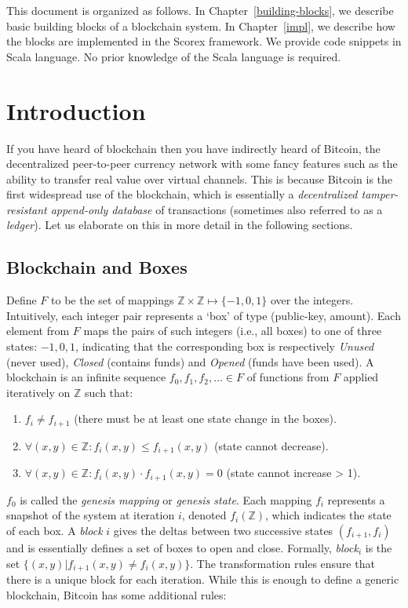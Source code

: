 \documentclass[]{report}   %
\begin{document}
This document is organized as follows. In Chapter~\ref{building-blocks}, we describe basic building blocks of a blockchain system. In Chapter~\ref{impl}, we describe how the blocks are implemented in the Scorex framework. We provide code snippets in Scala language. No prior knowledge of the Scala language is required.


\chapter{Introduction}

If you have heard of blockchain then you have indirectly heard of Bitcoin, the decentralized peer-to-peer currency network with some fancy features such as the ability to transfer real value over virtual channels. This is because Bitcoin is the first widespread use of the blockchain, which is essentially a {\em decentralized tamper-resistant append-only database} of transactions (sometimes also referred to as a {\em ledger}). Let us elaborate on this in more detail in the following sections. 

\section{Blockchain and Boxes}


Define $F$ to be the set of mappings $\mathbb{Z}\times\mathbb{Z} \mapsto \{-1, 0, 1\}$ over the integers. 
Intuitively, each integer pair represents a `box' of type (public-key, amount). Each element from $F$ maps the pairs of such integers (i.e., all boxes) to one of three states: $-1, 0, 1$, indicating that the corresponding box is respectively {\em Unused} (never used), {\em Closed} (contains funds) and {\em Opened} (funds have been used).
A blockchain is an infinite sequence $f_0, f_1, f_2, \ldots \in F$ of functions from $F$ applied iteratively on $\mathbb{Z}$ such that: %
\begin{enumerate}
	\item $f_i \neq f_{i+1}$ (there must be at least one state change in the boxes).
	\item $\forall (x, y) \in \mathbb{Z}: f_i(x, y) \leq f_{i+1}(x, y)$ (state cannot decrease).
	\item $\forall (x, y) \in \mathbb{Z}: f_i(x, y)\cdot f_{i+1}(x, y) = 0$ (state cannot increase > 1).
\end{enumerate}

$f_0$ is called the {\em genesis mapping} or {\em genesis state}. Each mapping $f_i$ represents a snapshot of the system at iteration $i$, denoted $f_i(\mathbb{Z})$, which indicates the state of each box. A {\em block} $i$ gives the deltas between two successive states $(f_{i+1}, f_{i})$ and is essentially defines a set of boxes to open and close. Formally, {\em block}$_{i}$ is the set $\{(x, y)|f_{i+1}(x, y)\neq f_i(x, y)\}$. The transformation rules ensure that there is a unique block for each iteration. While this is enough to define a generic blockchain, Bitcoin has some additional rules:
\end{document}

